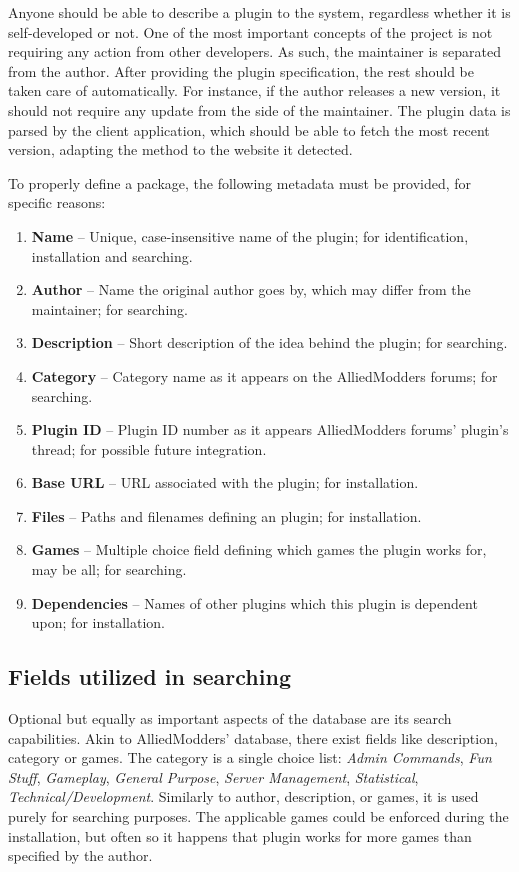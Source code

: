 Anyone should be able to describe a plugin to the system, regardless whether it is self-developed or not.
One of the most important concepts of the project is not requiring any action from other developers.
As such, the maintainer is separated from the author.
After providing the plugin specification, the rest should be taken care of automatically.
For instance, if the author releases a new version, it should not require any update from the side of the maintainer.
The plugin data is parsed by the client application, which should be able to fetch the most recent version, adapting the method to the website it detected.

To properly define a package, the following metadata must be provided, for specific reasons:
\begin{enumerate}
    \item \textbf{Name} -- Unique, case-insensitive name of the plugin; for identification, installation and searching.
    \item \textbf{Author} -- Name the original author goes by, which may differ from the maintainer; for searching.
    \item \textbf{Description} -- Short description of the idea behind the plugin; for searching.
    \item \textbf{Category} -- Category name as it appears on the AlliedModders forums; for searching.
    \item \textbf{Plugin ID} -- Plugin ID number as it appears AlliedModders forums' plugin's thread; for possible future integration.
    \item \textbf{Base URL} -- URL associated with the plugin; for installation.
    \item \textbf{Files} -- Paths and filenames defining an plugin; for installation.
    \item \textbf{Games} -- Multiple choice field defining which games the plugin works for, may be all; for searching.
    \item \textbf{Dependencies} -- Names of other plugins which this plugin is dependent upon; for installation.
\end{enumerate}

\subsection{Fields utilized in searching}

Optional but equally as important aspects of the database are its search capabilities.
Akin to AlliedModders' database, there exist fields like description, category or games.
The category is a single choice list: \textit{Admin Commands}, \textit{Fun Stuff}, \textit{Gameplay}, \textit{General Purpose}, \textit{Server Management}, \textit{Statistical}, \textit{Technical/Development}.
Similarly to author, description, or games, it is used purely for searching purposes.
The applicable games could be enforced during the installation, but often so it happens that plugin works for more games than specified by the author.

